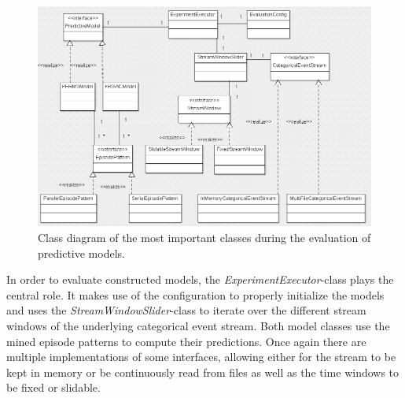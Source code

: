 \begin{figure}[h]
	\centering
  	\includegraphics[width=\textwidth]{classDiagram1}
	\caption{Class diagram of the most important classes during the evaluation of predictive models.}
	\label{fig_classDiagram1}
\end{figure}

In order to evaluate constructed models, the \textit{ExperimentExecutor}-class plays the central role. It makes use of the configuration to properly initialize the models and uses the \textit{StreamWindowSlider}-class to iterate over the different stream windows of the underlying categorical event stream. Both model classes use the mined episode patterns to compute their predictions. Once again there are multiple implementations of some interfaces, allowing either for the stream to be kept in memory or be continuously read from files as well as the time windows to be fixed or slidable. 

